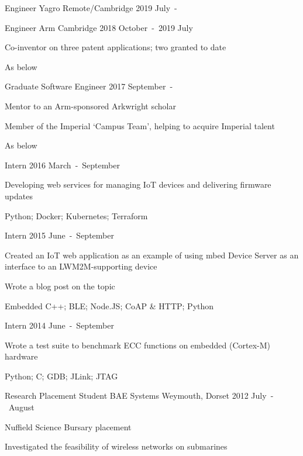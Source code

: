 \begin{cventries}

\cventry
  {Engineer}
  {Yagro}
  {Remote/Cambridge}
  {2019 July~-}
  {\begin{cvitems}
  \end{cvitems}}

\cventry
  {Engineer}
  {Arm}
  {Cambridge}
  {2018 October~-~2019 July}
  {\begin{cvitems}
    \item {Co-inventor on three patent applications; two granted to date}
    \item {As below}
  \end{cvitems}}

\cventryprevrole
  {Graduate Software Engineer}
  {2017 September~-}
  {\begin{cvitems}
    \item {Mentor to an Arm-sponsored Arkwright scholar}
    \item {Member of the Imperial `Campus Team', helping to acquire Imperial talent}
    \item {As below}
  \end{cvitems}}

\cventryprevrole
  {Intern}
  {2016 March~-~September}
  {\begin{cvitems}
    \item {Developing web services for managing IoT devices and delivering firmware updates}
    \item {Python; Docker; Kubernetes; Terraform}
  \end{cvitems}}

\cventryprevrole
  {Intern}
  {2015 June~-~September}
  {\begin{cvitems}
    \item {Created an IoT web application as an example of using mbed Device Server as an interface to an LWM2M-supporting device}
    \item {Wrote a blog post on the topic}
    \item {Embedded C++; BLE; Node.JS; CoAP \& HTTP; Python}
  \end{cvitems}}

\cventryprevrole
  {Intern}
  {2014 June~-~September}
  {\begin{cvitems}
    \item {Wrote a test suite to benchmark ECC functions on embedded (Cortex-M) hardware}
    \item {Python; C; GDB; JLink; JTAG}
  \end{cvitems}}

\cventry
  {Research Placement Student}
  {BAE Systems}
  {Weymouth, Dorset}
  {2012 July~-~August}
  {\begin{cvitems}
    \item {Nuffield Science Bursary placement}
    \item {Investigated the feasibility of wireless networks on submarines}
  \end{cvitems}}

\end{cventries}

